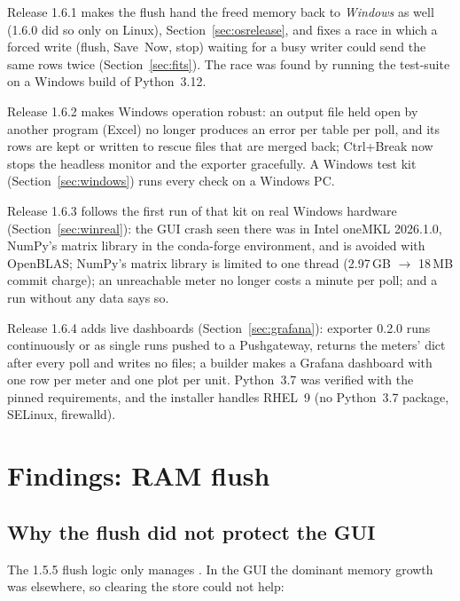 \documentclass[11pt,a4paper]{article}
\newcommand{\code}[1]{\texttt{\detokenize{#1}}}
\begin{document}
Release 1.6.1 makes the flush hand the freed memory back to \emph{Windows}
as well (1.6.0 did so only on Linux), Section~\ref{sec:osrelease}, and fixes a
race in which a forced write (flush, Save~Now, stop) waiting for a busy writer
could send the same rows twice (Section~\ref{sec:fits}). The race was found by
running the test-suite on a Windows build of Python~3.12.

Release 1.6.2 makes Windows operation robust: an output file held open by
another program (Excel) no longer produces an error per table per poll, and
its rows are kept or written to rescue files that are merged back; Ctrl+Break
now stops the headless monitor and the exporter gracefully. A Windows test
kit (Section~\ref{sec:windows}) runs every check on a Windows PC.

Release 1.6.3 follows the first run of that kit on real Windows hardware
(Section~\ref{sec:winreal}): the GUI crash seen there was in Intel oneMKL
2026.1.0, NumPy's matrix library in the conda-forge environment, and is
avoided with OpenBLAS; NumPy's matrix library is limited to one thread
(2.97\,GB $\rightarrow$ 18\,MB commit charge); an unreachable meter no longer
costs a minute per poll; and a run without any data says so.

Release 1.6.4 adds live dashboards (Section~\ref{sec:grafana}): exporter
0.2.0 runs continuously or as single runs pushed to a Pushgateway, returns
the meters' dict after every poll and writes no files; a builder makes a
Grafana dashboard with one row per meter and one plot per unit. Python~3.7
was verified with the pinned requirements, and the installer handles
RHEL~9 (no Python~3.7 package, SELinux, firewalld).

\section{Findings: RAM flush}\label{sec:ramflush}
\subsection{Why the flush did not protect the GUI}
The 1.5.5 flush logic only manages \code{TIME_SERIES_STORE}. In the GUI the
dominant memory growth was elsewhere, so clearing the store could not help:
\end{document}
